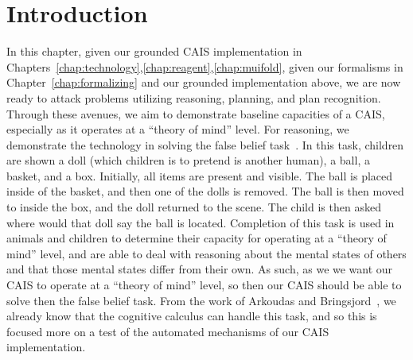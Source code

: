 \section{Introduction}

In this chapter, given our grounded CAIS implementation in 
Chapters~\ref{chap:technology},\ref{chap:reagent},\ref{chap:muifold},
given our formalisms in Chapter~\ref{chap:formalizing} and our grounded
implementation above, we are now ready to attack problems utilizing
reasoning, planning, and plan recognition. Through these avenues, we
aim to demonstrate baseline capacities of a CAIS, especially as it
operates at a ``theory of mind'' level. For reasoning, we demonstrate
the technology in solving the false belief 
task~\cite{premack_does_1978,frith_theory_2005}. In this task, children
are shown a doll (which children is to pretend is another human),
a ball, a basket, and a box. Initially, all items are present and
visible. The ball is placed inside of the basket, and then one of the dolls
is removed. The ball is then moved to inside the box, and the doll returned
to the scene. The child is then asked where would that doll say the ball
is located. Completion of this task is used in animals and children to
determine their capacity for operating at a ``theory of mind'' level, and
are able to deal with reasoning about the mental states of others and
that those mental states differ from their own. As such, as we we want
our CAIS to operate at a ``theory of mind'' level, so then our
CAIS should be able to solve then the false belief task. From the
work of Arkoudas and Bringsjord~\cite{arkoudas_formalizing_2008},
we already know that the cognitive calculus can handle this task,
and so this is focused more on a test of the automated mechanisms of
our CAIS implementation.

